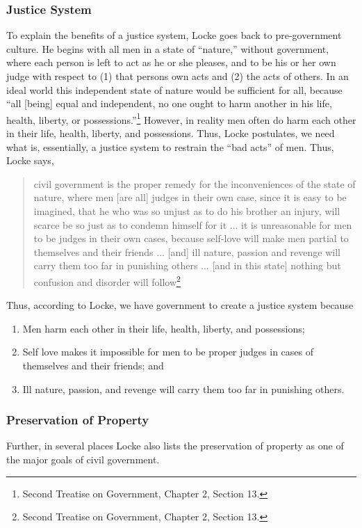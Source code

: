 \subsubsection{Justice System}
To explain the benefits of a justice system, Locke goes back to pre-government culture.  He begins with all men in a state of ``nature,'' without government, where each person is left to act as he or she pleases, and to be his or her own judge with respect to (1) that persons own acts and (2) the acts of others.  In an ideal world this independent state of nature would be sufficient for all, because ``all [being] equal and independent, no one ought to harm another in his life, health, liberty, or possessions.''\footnote{Second Treatise on Government, Chapter 2, Section 13.}  However, in reality men often do harm each other in their life, health, liberty, and possessions.  Thus, Locke postulates, we need what is, essentially, a justice system to restrain the ``bad acts'' of men.  Thus, Locke says, 
\begin{quote}
civil government is the proper remedy for the inconveniences of the state of nature, where men [are all] judges in their own case, since it is easy to be imagined, that he who was so unjust as to do his brother an injury, will scarce be so just as to condemn himself for it ... it is unreasonable for men to be judges in their own cases, because self-love will make men partial to themselves and their friends ... [and] ill nature, passion and revenge will carry them too far in punishing others ... [and in this state] nothing but confusion and disorder will follow\footnote{Second Treatise on Government, Chapter 2, Section 13.}
\end{quote}

Thus, according to Locke, we have government to create a justice system because
\begin{enumerate}
\item Men harm each other in their life, health, liberty, and possessions;
\item Self love makes it impossible for men to be proper judges in cases of themselves and their friends; and 
\item Ill nature, passion, and revenge will carry them too far in punishing others.
\end{enumerate}

\subsubsection{Preservation of Property}
Further, in several places Locke also lists the preservation of property as one of the major goals of civil government.

